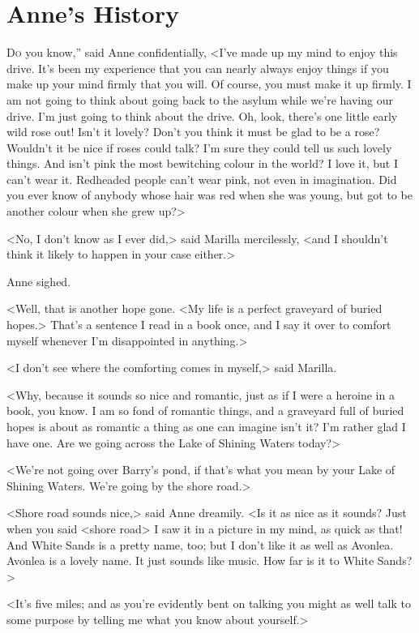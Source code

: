 \chapter{Anne's History}

\lettrine[ante=“,]{D}{o} you know,” said Anne confidentially, <I've made up my mind to enjoy this drive. It's been my experience that you can nearly always enjoy things if you make up your mind firmly that you will. Of course, you must make it up firmly. I am not going to think about going back to the asylum while we're having our drive. I'm just going to think about the drive. Oh, look, there's one little early wild rose out! Isn't it lovely? Don't you think it must be glad to be a rose? Wouldn't it be nice if roses could talk? I'm sure they could tell us such lovely things. And isn't pink the most bewitching colour in the world? I love it, but I can't wear it. Redheaded people can't wear pink, not even in imagination. Did you ever know of anybody whose hair was red when she was young, but got to be another colour when she grew up?>

<No, I don't know as I ever did,> said Marilla mercilessly, <and I shouldn't think it likely to happen in your case either.>

Anne sighed.

<Well, that is another hope gone. <My life is a perfect graveyard of buried hopes.> That's a sentence I read in a book once, and I say it over to comfort myself whenever I'm disappointed in anything.>

<I don't see where the comforting comes in myself,> said Marilla.

<Why, because it sounds so nice and romantic, just as if I were a heroine in a book, you know. I am so fond of romantic things, and a graveyard full of buried hopes is about as romantic a thing as one can imagine isn't it? I'm rather glad I have one. Are we going across the Lake of Shining Waters today?>

<We're not going over Barry's pond, if that's what you mean by your Lake of Shining Waters. We're going by the shore road.>

<Shore road sounds nice,> said Anne dreamily. <Is it as nice as it sounds? Just when you said <shore road> I saw it in a picture in my mind, as quick as that! And White Sands is a pretty name, too; but I don't like it as well as Avonlea. Avonlea is a lovely name. It just sounds like music. How far is it to White Sands?>

<It's five miles; and as you're evidently bent on talking you might as well talk to some purpose by telling me what you know about yourself.>


